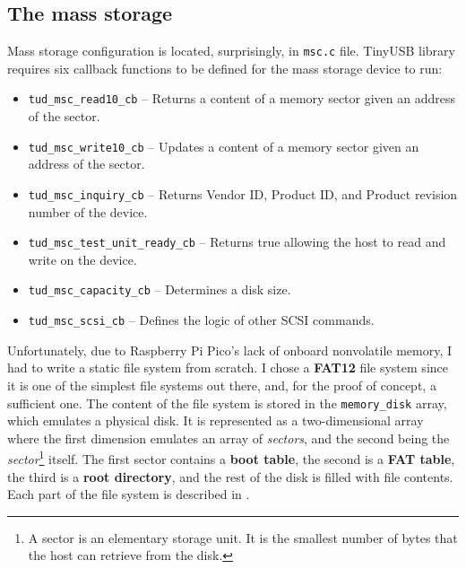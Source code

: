 \subsection{The mass storage}
Mass storage configuration is located, surprisingly, in \verb|msc.c| file. TinyUSB library requires six callback functions to be defined for the mass storage device to run:
\begin{itemize}
    \item \verb|tud_msc_read10_cb| -- Returns a content of a memory sector given an address of the sector.
    \item \verb|tud_msc_write10_cb| -- Updates a content of a memory sector given an address of the sector.
    \item \verb|tud_msc_inquiry_cb| -- Returns Vendor ID, Product ID, and Product revision number of the device.
    \item \verb|tud_msc_test_unit_ready_cb| -- Returns true allowing the host to read and write on the device.
    \item \verb|tud_msc_capacity_cb| -- Determines a disk size.
    \item \verb|tud_msc_scsi_cb| -- Defines the logic of other SCSI commands.
\end{itemize}
Unfortunately, due to Raspberry Pi Pico's lack of onboard nonvolatile memory, I had to write a static file system from scratch. I chose a \textbf{FAT12} file system since it is one of the simplest file systems out there, and, for the proof of concept, a sufficient one. The content of the file system is stored in the \verb|memory_disk| array, which emulates a physical disk. It is represented as a two-dimensional array where the first dimension emulates an array of \emph{sectors}, and the second being the \emph{sector}\footnote{A sector is an elementary storage unit. It is the smallest number of bytes that the host can retrieve from the disk.} itself. The first sector contains a \textbf{boot table}, the second is a \textbf{FAT table}, the third is a \textbf{root directory}, and the rest of the disk is filled with file contents. Each part of the file system is described in \cite{fatFS}.

